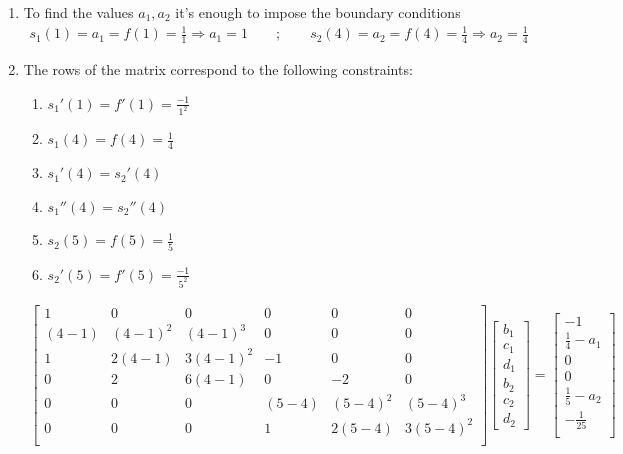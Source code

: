 \documentclass{article}
\begin{document}
    \begin{enumerate}[label=(\roman*)]
        \item To find the values $a_1,a_2$ it's enough to impose the boundary conditions
        \begin{align}
            s_1(1)=a_1 = f(1)=\frac{1}{1} \Longrightarrow a_1 = 1 \qquad ; \qquad s_2(4)=a_2=f(4)=\frac{1}{4} \Longrightarrow a_2 = \frac{1}{4}
        \end{align}
        \item The rows of the matrix correspond to the following constraints:
        \begin{enumerate}[label=\arabic*.]
            \item $s_1'(1)=f'(1)=\frac{-1}{1^2}$
            \item $s_1(4)=f(4)=\frac{1}{4}$
            \item $s_1'(4)=s_2'(4)$
            \item $s_1''(4)=s_2''(4)$
            \item $s_2(5)=f(5)=\frac{1}{5}$
             \item $s_2'(5)=f'(5)=\frac{-1}{5^2}$
        \end{enumerate}
        \begin{align}
            \begin{bmatrix}
            1 & 0 & 0 & 0 & 0 & 0 \\
            (4-1) & (4-1)^2 & (4-1)^3 & 0 & 0 & 0\\
             1 & 2(4-1) & 3(4-1)^2 & -1 & 0 & 0 \\
            0 & 2 & 6(4-1) & 0 & -2 & 0 \\
            0 & 0 & 0 & (5-4) & (5-4)^2 & (5-4)^3 \\
            0 & 0 & 0 & 1 & 2(5-4) & 3(5-4)^2 \\
            \end{bmatrix}
            \begin{bmatrix}
                b_1 \\
                c_1 \\
                d_1 \\
                b_2 \\
                c_2 \\
                d_2
            \end{bmatrix}
            =
            \begin{bmatrix}
                -1 \\
                \frac{1}{4} - a_1 \\
                0 \\
                0 \\
                \frac{1}{5}-a_2 \\
                -\frac{1}{25} \\
            \end{bmatrix}
        \end{align}
        

\end{enumerate}
\end{document}
